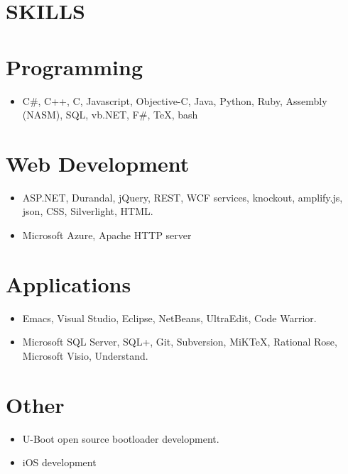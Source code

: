 \documentclass[margin, 11pt]{res}
\begin{document}
\begin{resume}
\section{SKILLS} 
\normalsize{\section{Programming}}
                 \begin{itemize}
                 \item[] C\#, C++, C,  Javascript, Objective-C, Java, Python, Ruby, Assembly (NASM), SQL, vb.NET, F\#, TeX, bash 
                 \end{itemize}
\normalsize{\section{Web Development}} 
                 \begin{itemize}
                  \item[] ASP.NET, Durandal, jQuery, REST, WCF services, knockout, amplify.js, json, CSS, Silverlight, HTML.
                  \item[] Microsoft Azure, Apache HTTP server 
                  \end{itemize}
\normalsize{\section{Applications}}
	           		\begin{itemize}
	           			\item[] Emacs, Visual Studio, Eclipse, NetBeans, UltraEdit, Code Warrior.
	           			\item[] Microsoft SQL Server, SQL+, Git, Subversion, MiKTeX, Rational Rose, Microsoft Visio, Understand.	           				
                   \end{itemize}
\normalsize{\section{Other}}
				\begin{itemize}
					\item[] U-Boot open source bootloader development.
					\item[] iOS development
		\end{itemize}
                            
\end{resume} 
\end{document}
